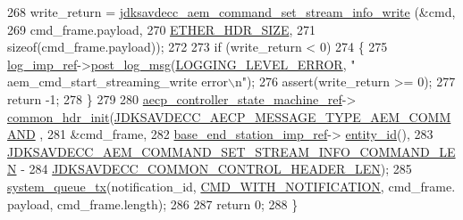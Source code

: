 \begin{DoxyCode}
268     write\_return = \hyperlink{group__command__set__stream__info_gacd184f2efdcdb28691a2d1873067f6b8}{jdksavdecc\_aem\_command\_set\_stream\_info\_write}
      (&cmd,
269                                                                 cmd\_frame.payload,
270                                                                 \hyperlink{namespaceavdecc__lib_a6c827b1a0d973e18119c5e3da518e65ca9512ad9b34302ba7048d88197e0a2dc0}{ETHER\_HDR\_SIZE},
271                                                                 \textcolor{keyword}{sizeof}(cmd\_frame.payload));
272 
273     \textcolor{keywordflow}{if} (write\_return < 0)
274     \{
275         \hyperlink{namespaceavdecc__lib_acbe3e2a96ae6524943ca532c87a28529}{log\_imp\_ref}->\hyperlink{classavdecc__lib_1_1log_a68139a6297697e4ccebf36ccfd02e44a}{post\_log\_msg}(\hyperlink{namespaceavdecc__lib_a501055c431e6872ef46f252ad13f85cdaf2c4481208273451a6f5c7bb9770ec8a}{LOGGING\_LEVEL\_ERROR}, \textcolor{stringliteral}{"
      aem\_cmd\_start\_streaming\_write error\(\backslash\)n"});
276         assert(write\_return >= 0);
277         \textcolor{keywordflow}{return} -1;
278     \}
279 
280     \hyperlink{namespaceavdecc__lib_a0b1b5aea3c0490f77cbfd9178af5be22}{aecp\_controller\_state\_machine\_ref}->
      \hyperlink{classavdecc__lib_1_1aecp__controller__state__machine_aafc737d7ed17a62fed9df6528f18d3ec}{common\_hdr\_init}(\hyperlink{group__aecp__message__type_ga4625ce189cc209f42deb0629f48faf69}{JDKSAVDECC\_AECP\_MESSAGE\_TYPE\_AEM\_COMMAND}
      ,
281                                                        &cmd\_frame,
282                                                        \hyperlink{classavdecc__lib_1_1descriptor__base__imp_a550c969411f5f3b69f55cc139763d224}{base\_end\_station\_imp\_ref}->
      \hyperlink{classavdecc__lib_1_1end__station__imp_a363b6c9664a0d701def9b17863e20ad3}{entity\_id}(),
283                                                        
      \hyperlink{group__command__set__stream__info_ga07fbd87fc77d6b4b2bd0b4e05900729d}{JDKSAVDECC\_AEM\_COMMAND\_SET\_STREAM\_INFO\_COMMAND\_LEN} -
284                                                            
      \hyperlink{group__jdksavdecc__avtp__common__control__header_gaae84052886fb1bb42f3bc5f85b741dff}{JDKSAVDECC\_COMMON\_CONTROL\_HEADER\_LEN});
285     \hyperlink{namespaceavdecc__lib_a6dd511685627c0865a3442b539a4e8e9}{system\_queue\_tx}(notification\_id, \hyperlink{namespaceavdecc__lib_aabcadff06aa62be0ce47bc0646823604aba48b8a017e06fb240b650cdea965178}{CMD\_WITH\_NOTIFICATION}, cmd\_frame.
      payload, cmd\_frame.length);
286 
287     \textcolor{keywordflow}{return} 0;
288 \}
\end{DoxyCode}



